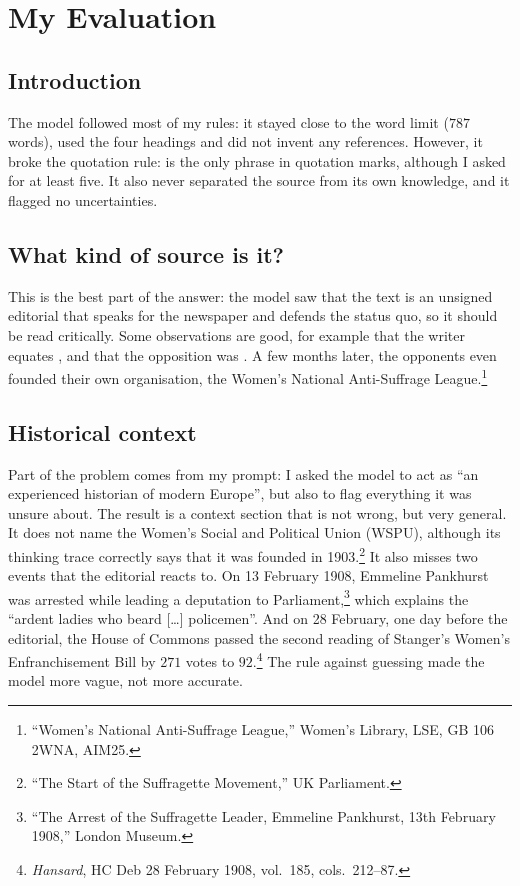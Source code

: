 \section{My Evaluation}

\subsection{Introduction}

The model followed most of my rules: it stayed close to the word limit ($787$ words), used the four headings and did not invent any references.
However, it broke the quotation rule:  is the only phrase in quotation marks, although I asked for at least five.
It also never separated the source from its own knowledge, and it flagged no uncertainties.

\subsection{What kind of source is it?}

This is the best part of the answer: the model saw that the text is an unsigned editorial that speaks for the newspaper and defends the status quo, so it should be read critically.
Some observations are good, for example that the writer equates ,
and that the opposition was .
A few months later, the opponents even founded their own organisation, the Women's National Anti-Suffrage League.\footnote{\enquote{Women's National Anti-Suffrage League,} Women's Library, LSE, GB 106 2WNA, AIM25.}

\subsection{Historical context}

Part of the problem comes from my prompt: I asked the model to act as \enquote{an experienced historian of modern Europe}, but also to flag everything it was unsure about.
The result is a context section that is not wrong, but very general.
It does not name the Women's Social and Political Union (WSPU), although its thinking trace correctly says that it was founded in 1903.\footnote{\enquote{The Start of the Suffragette Movement,} UK Parliament.}
It also misses two events that the editorial reacts to.
On 13 February 1908, Emmeline Pankhurst was arrested while leading a deputation to Parliament,\footnote{\enquote{The Arrest of the Suffragette Leader, Emmeline Pankhurst, 13th February 1908,} London Museum.}
which explains the \enquote{ardent ladies who beard [\ldots] policemen}.
And on 28 February, one day before the editorial, the House of Commons passed the second reading of Stanger's Women's Enfranchisement Bill by $271$ votes to $92$.\footnote{\emph{Hansard}, HC Deb 28 February 1908, vol.~185, cols.~212--87.}
The rule against guessing made the model more vague, not more accurate.

